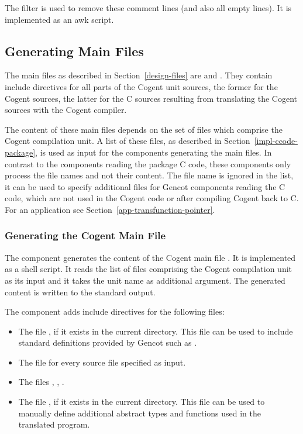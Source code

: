 The filter  is used to remove these comment lines (and also all empty lines). It is implemented
as an awk script.

\subsection{Generating Main Files}
\label{impl-ocomps-main}

The main files as described in Section~\ref{design-files} are  and . They
contain include directives for all parts of the Cogent unit sources, the former for the Cogent sources, the latter 
for the C sources resulting from translating the Cogent sources with the Cogent compiler.

The content of these main files depends on the set of  files which comprise the Cogent compilation unit.
A list of these files, as described in Section~\ref{impl-ccode-package}, is used as input for the components generating
the main files. In contrast to the components reading the package C code, these components only process the file 
names and not their content. The file name  is ignored in the list, it can be used
to specify additional  files for Gencot components reading the C code, which are not used in the Cogent 
code or after compiling Cogent back to C. For an application see Section~\ref{app-transfunction-pointer}.

\subsubsection{Generating the Cogent Main File}

The component  generates the content of the Cogent main file . 
It is implemented as a shell script. It reads the list of
 files comprising the Cogent compilation unit as its input and it takes the unit name 
as additional argument. The generated content is written to the standard output. 

The component adds include directives for the following files:
\begin{itemize}
\item The file , if it exists in the current directory. This file can be used to include standard 
definitions provided by Gencot such as .
\item The file  for every source file  specified as input.
\item The files , , .
\item The file , if it exists in the current directory. This file can be used to
manually define additional abstract types and functions used in the translated program.
\end{itemize}

